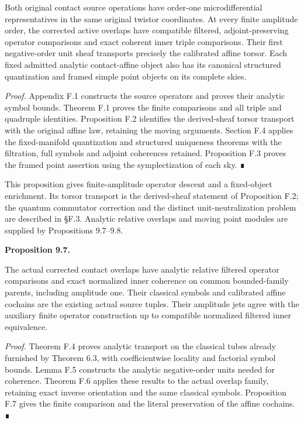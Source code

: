 \documentclass[
  english,
  11pt,
  reqno]{amsart}
\makeatletter
\newcommand{\pandocstatementheading}[1]{%
  \par\addpenalty{\@beginparpenalty}%
  \addvspace{.5\baselineskip plus .2\baselineskip minus .2\baselineskip}%
  {\normalfont\bfseries #1\par}%
  \nobreak\@afterindenttrue\@afterheading
}
\makeatother
\begin{document}
Both original contact source operations have order-one microdifferential
representatives in the same original twistor coordinates. At every
finite amplitude order, the corrected active overlaps have compatible
filtered, adjoint-preserving operator comparisons and exact coherent
inner triple comparisons. Their first negative-order unit sheaf
transports precisely the calibrated affine torsor. Each fixed admitted
analytic contact-affine object also has its canonical structured
quantization and framed simple point objects on its complete skies.

\emph{Proof.} Appendix F.1 constructs the source operators and proves
their analytic symbol bounds. Theorem F.1 proves the finite comparisons
and all triple and quadruple identities. Proposition F.2 identifies the
derived-sheaf torsor transport with the original affine law, retaining
the moving arguments. Section F.4 applies the fixed-manifold
quantization and structured uniqueness theorems with the filtration,
full symbols and adjoint coherences retained. Proposition F.3 proves the
framed point assertion using the symplectization of each sky. ∎

This proposition gives finite-amplitude operator descent and a
fixed-object enrichment. Its torsor transport is the derived-sheaf
statement of Proposition F.2; the quantum commutator correction and the
distinct unit-neutralization problem are described in §F.3. Analytic
relative overlaps and moving point modules are supplied by Propositions
9.7--9.8.

\pandocstatementheading{\protect{}\label{prop:gg-analytic-source-operator-realization}Proposition 9.7.}

The actual corrected contact overlaps have analytic relative filtered
operator comparisons and exact normalized inner coherence on common
bounded-family parents, including amplitude one. Their classical symbols
and calibrated affine cochains are the existing actual source tuples.
Their amplitude jets agree with the auxiliary finite operator
construction up to compatible normalized filtered inner equivalence.

\emph{Proof.} Theorem F.4 proves analytic transport on the classical
tubes already furnished by Theorem 6.3, with coefficientwise locality
and factorial symbol bounds. Lemma F.5 constructs the analytic
negative-order units needed for coherence. Theorem F.6 applies these
results to the actual overlap family, retaining exact inverse
orientation and the same classical symbols. Proposition F.7 gives the
finite comparison and the literal preservation of the affine cochains. ∎
\end{document}
